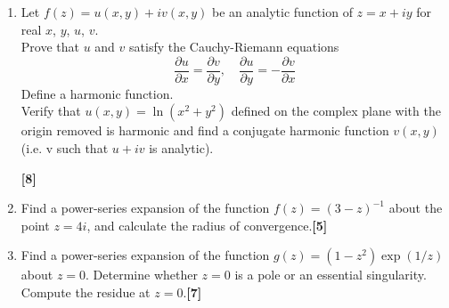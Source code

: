 \documentclass[a4paper]{article}
\begin{document}
\begin{qns}\leavevmode
\begin{enumerate}[label=(\alph*)]
\item Let $f(z) = u(x, y) + iv(x, y)$ be an analytic function of $z = x + iy$ for real $x$, $y$, $u$, $v$.\\[5pt] 
Prove that $u$ and $v$ satisfy the Cauchy-Riemann equations
$$\frac{\partial u}{\partial x}=\frac{\partial v}{\partial y},\quad\frac{\partial u}{\partial y}=-\frac{\partial v}{\partial x}$$
Define a harmonic function.\\[5pt]
Verify that $u(x, y) = \ln(x^2 + y^2)$ defined on the complex plane with the origin removed is harmonic and find a conjugate harmonic function $v(x, y)$ (i.e. v such that $u + iv$ is analytic).

\hfill\textbf{[8]}
\item Find a power-series expansion of the function $f(z) = (3 − z)^{−1}$ about the point $z = 4i$, and calculate the radius of convergence.\hfill\textbf{[5]}
\item Find a power-series expansion of the function $g(z) = (1−z^2)\exp(1/z)$ about $z = 0$. Determine whether $z = 0$ is a pole or an essential singularity. Compute the residue at $z = 0$.\hfill\textbf{[7]}
\end{enumerate}
\end{qns}
\end{document}
